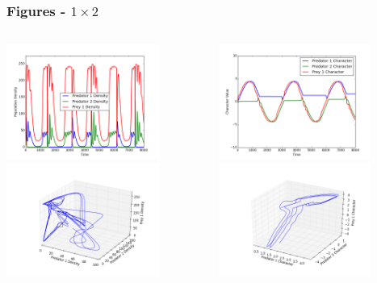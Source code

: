 \documentclass[10pt]{beamer}
\begin{document}
\begin{frame}
	\frametitle{Figures - $1\times2$}
	\begin{columns}[t]
		\begin{column}{.5\textwidth}
			\centering
			\includegraphics[width=5cm,height=3.75cm]{figures/2x1/variable_growth/densities_fast_prey_evo.png}\\
			\includegraphics[width=5cm,height=3.75cm]{figures/2x1/variable_growth/density_phase_plane_fast_prey_evo.png}
		\end{column}
		\begin{column}{.5\textwidth}
			\centering
			\includegraphics[width=5cm,height=3.75cm]{figures/2x1/variable_growth/traits_fast_prey_evo.png}\\
			\includegraphics[width=5cm,height=3.75cm]{figures/2x1/variable_growth/trait_phase_plane_fast_prey_evo.png}
		\end{column}
	\end{columns}
\end{frame}
\end{document}
